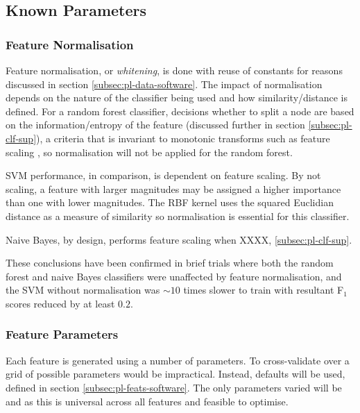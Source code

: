     \subsection{Known Parameters}
    \label{subsec:exp-clf-known}  
        \subsubsection{Feature Normalisation}
        \label{subsubsec:exp-clf-known-featnorm}
            Feature normalisation, or \textit{whitening}, is done with reuse of constants for reasons discussed in section \ref{subsec:pl-data-software}. The impact of normalisation depends on the nature of the classifier being used and how similarity/distance is defined. For a random forest classifier, decisions whether to split a node are based on the information/entropy of the feature (discussed further in section \ref{subsec:pl-clf-sup}), a criteria that is invariant to monotonic transforms such as feature scaling \cite{Hastie2009}, so normalisation will not be applied for the random forest.
            
            SVM performance, in comparison, is dependent on feature scaling. By not scaling, a feature with larger magnitudes may be assigned a higher importance than one with lower magnitudes. The RBF kernel uses the squared Euclidian distance as a measure of similarity so normalisation is essential for this classifier.
            
            Naive Bayes, by design, performs feature scaling when XXXX, \ref{subsec:pl-clf-sup}. 
            
            These conclusions have been confirmed in brief trials where both the random forest and naive Bayes classifiers were unaffected by feature normalisation, and the SVM without normalisation was $\sim10$ times slower to train with resultant F$_{1}$ scores reduced by at least $0.2$.
    
            
        \subsubsection{Feature Parameters}
        \label{subsubsec:exp-clf-known-featparam}
            Each feature is generated using a number of parameters. To cross-validate over a grid of possible parameters would be impractical. Instead, defaults will be used, defined in section \ref{subsec:pl-feats-software}. The only parameters varied will be  and  as this is universal across all features and feasible to optimise.
        
